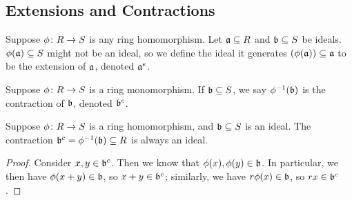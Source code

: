 \subsection*{Extensions and Contractions}

\begin{definition}
    Suppose \(\phi\colon R\to S\) is any ring homomorphism.
    Let \(\mathfrak{a} \subseteq R\) and \(\mathfrak{b} \subseteq S\) be ideals.
    \(\phi(\mathfrak{a}) \subseteq S\) might not be an ideal,
    so we define the ideal it generates \((\phi(\mathfrak{a})) \subseteq \mathfrak{a}\)
    to be the extension of \(\mathfrak{a}\), denoted \(\mathfrak{a}^e\).
\end{definition}
\begin{definition}
    Suppose \(\phi\colon R\to S\) is a ring monomorphism.
    If \(\mathfrak{b} \subseteq S\),
    we say \(\phi^{-1}(\mathfrak{b})\) is the contraction of \(\mathfrak{b}\),
    denoted \(\mathfrak{b}^c\).
\end{definition}
\begin{lemma}
    Suppose \(\phi\colon R\to S\) is a ring homomorphism,
    and \(\mathfrak{b} \subseteq S\) is an ideal.
    The contraction \(\mathfrak{b}^c = \phi^{-1}(\mathfrak{b}) \subseteq R\) is always an ideal.
\end{lemma}
\begin{proof}
    Consider \(x,y \in \mathfrak{b}^c\).
    Then we know that \(\phi(x),\phi(y) \in \mathfrak{b}\).
    In particular, we then have \(\phi(x+y) \in \mathfrak{b}\), so \(x+y \in \mathfrak{b}^c\);
    similarly, we have \(r\phi(x) \in \mathfrak{b}\), so \(rx \in \mathfrak{b}^c\).
\end{proof}


